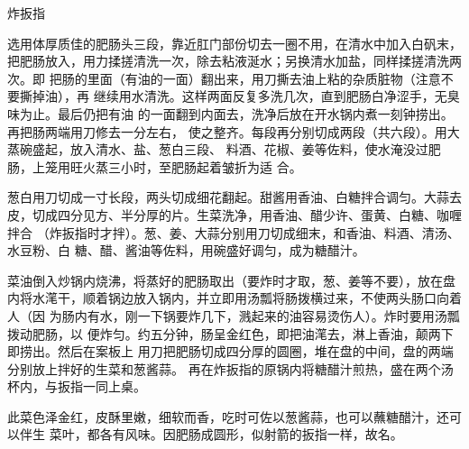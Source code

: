 \begin{recipe}{炸扳指}

\ingredients


\preparation

\step 选用体厚质佳的肥肠头三段，靠近肛门部份切去一圈不用，在清水中加入白矾末，
把肥肠放入，用力揉搓清洗一次，除去粘液涎水；另换清水加盐，同样揉搓清洗两次。即
把肠的里面（有油的一面）翻出来，用刀撕去油上粘的杂质脏物（注意不要撕掉油），再
继续用水清洗。这样两面反复多洗几次，直到肥肠白净涩手，无臭味为止。最后仍把有油
的一面翻到内面去，洗净后放在开水锅内煮一刻钟捞出。再把肠两端用刀修去一分左右，
使之整齐。每段再分别切成两段（共六段）。用大蒸碗盛起，放入清水、盐、葱白三段、
料酒、花椒、姜等佐料，使水淹没过肥肠，上笼用旺火蒸三小时，至肥肠起着皱折为适
合。

\step 葱白用刀切成一寸长段，两头切成细花翻起。甜酱用香油、白糖拌合调匀。大蒜去
皮，切成四分见方、半分厚的片。生菜洗净，用香油、醋少许、蛋黄、白糖、咖喱拌合
（炸扳指时才拌）。葱、姜、大蒜分别用刀切成细末，和香油、料酒、清汤、水豆粉、白
糖、醋、酱油等佐料，用碗盛好调匀，成为糖醋汁。

\step 菜油倒入炒锅内烧沸，将蒸好的肥肠取出（要炸时才取，葱、姜等不要），放在盘
内将水滗干，顺着锅边放入锅内，并立即用汤瓢将肠拨横过来，不使两头肠口向着人（因
为肠内有水，刚一下锅要炸几下，溅起来的油容易烫伤人）。炸时要用汤瓢拨动肥肠，以
便炸匀。约五分钟，肠呈金红色，即把油滗去，淋上香油，颠两下即捞出。然后在案板上
用刀把肥肠切成四分厚的圆圈，堆在盘的中间，盘的两端分别放上拌好的生菜和葱酱蒜。
再在炸扳指的原锅内将糖醋汁煎热，盛在两个汤杯内，与扳指一同上桌。

\features

此菜色泽金红，皮酥里嫩，细软而香，吃时可佐以葱酱蒜，也可以蘸糖醋汁，还可以伴生
菜叶，都各有风味。因肥肠成圆形，似射箭的扳指一样，故名。

\end{recipe}

